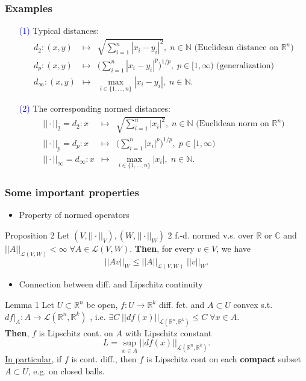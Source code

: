 \documentclass[10pt]{beamer}
\newcommand{\R}{\mathbb{R}}
\newcommand{\C}{\mathbb{C}}
\newcommand{\N}{\mathbb{N}}
\begin{document}
{\begin{frame}
\frametitle{Examples}
\begin{itemize}
\item[\textcolor{blue}{(1)}] Typical distances:
\begin{eqnarray*}
d_2:(x,y) &\mapsto& \sqrt{\sum_{i=1}^n |x_i-y_i|^2}, \;n\in \N\text{ (Euclidean distance on $\R^n$)}\\
d_p:(x,y) &\mapsto& \Big(\sum_{i=1}^n |x_i-y_i|^p\Big)^{1/p}, \;p\in [1,\infty) \text{ (generalization)}\\
d_\infty: (x,y) &\mapsto& \max_{i\in\{1, \dots,n\}} |x_i-y_i|, \;n\in \N.
\end{eqnarray*}
\item[\textcolor{blue}{(2)}] The corresponding normed distances:
\begin{eqnarray*}
||\cdot||_2=d_2:x &\mapsto& \sqrt{\sum_{i=1}^n |x_i|^2}, \;n\in \N\text{ (Euclidean norm on $\R^n$)}\\
||\cdot||_p=d_p:x &\mapsto& \Big(\sum_{i=1}^n |x_i|^p\Big)^{1/p}, \;p\in [1,\infty)\\
||\cdot||_\infty=d_\infty: x &\mapsto& \max_{i\in\{1, \dots,n\}} |x_i|,  \;n\in \N.
\end{eqnarray*}
\end{itemize}
\end{frame}

\begin{frame}
\frametitle{Some important properties}
\begin{itemize}
\item Property of normed operators
\end{itemize}
\begin{block}{Proposition 2}
Let $(V,||\cdot||_V), (W,||\cdot||_W)$ 2 f.-d.  normed v.s. over $\R$ or $\C$ and 
$||A||_{\mathcal{L}(V,W)} <\infty \; \forall A \in \mathcal{L}(V,W)$.
\textbf{Then},  for every $v\in V$, we have
$$||Av||_W \leq ||A||_{\mathcal{L}(V,W)} \;||v||_W.$$
\end{block}
\begin{itemize}
\item Connection between diff. and Lipschitz continuity
\end{itemize}
\begin{block}{Lemma 1}
Let $U\subset \R^n$ be open, $f:U \rightarrow \R^k$ diff. fct. and $A \subset U$ convex s.t.
$df|_A: A \rightarrow \mathcal{L}(\R^n,\R^k)$ ,  i.e. $\exists C \; ||df(x)||_{\mathcal{L}(\R^n,\R^k)} \leq C \; \forall x\in A$.\\
\textbf{Then}, $f$ is Lipschitz cont. on $A$ with Lipschitz constant
$$L=\sup_{x\in A} ||df(x)||_{\mathcal{L}(\R^n,\R^k)}.$$
\underline{In particular},  if $f$ is cont. diff., then $f$ is Lipschitz cont on each \textbf{compact} subset $A \subset U$, e.g. on closed balls.
\end{block}
\end{frame}






}
\end{document}
